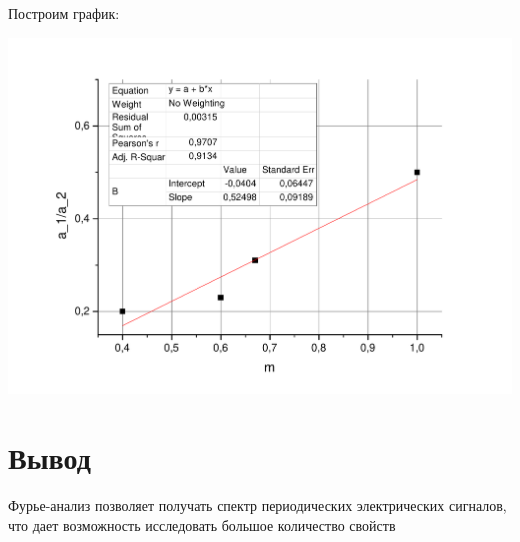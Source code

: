 \documentclass[a4paper,12pt]{article}
\begin{document}
		Построим график:
		
		\includegraphics[width = 0.7\linewidth]{graphC}
		
	\section{Вывод}
		Фурье-анализ позволяет получать спектр периодических электрических сигналов, что дает возможность исследовать большое количество свойств
		
\end{document}
